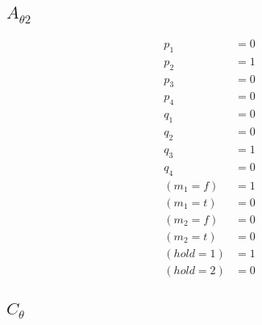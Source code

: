 \documentclass{scrartcl}
\begin{document}
\subsection{$A_{\theta 2}$}
\begin{align*}
  p_1 &= 0 \\
  p_2 &= 1 \\
  p_3 &= 0 \\
  p_4 &= 0 \\
  q_1 &= 0 \\
  q_2 &= 0 \\
  q_3 &= 1 \\
  q_4 &= 0 \\
  (m_1=f) &= 1 \\
  (m_1=t) &= 0 \\
  (m_2=f) &= 0 \\
  (m_2=t) &= 0 \\
  (hold=1) &= 1 \\
  (hold=2) &= 0
\end{align*}

\subsection{$C_\theta$}
\end{document}
